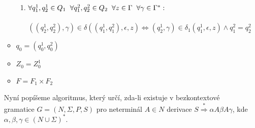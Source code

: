 \documentclass[a4paper,11pt]{article}[24.3.2010]
\begin{document}
\begin{enumerate}
\begin{itemize}
\begin{enumerate}
\item $\forall q_{1}^1,q_{2}^1 \in Q_{1} \hspace{2mm} \forall q_{1}^2,q_{2}^2 \in Q_{2} \hspace{2mm} \forall z \in \Gamma \hspace{2mm} \forall \gamma \in \Gamma^*:$\\\\
$((q_{2}^1,q_{2}^2),\gamma) \in \delta((q_{1}^1,q_{1}^2),\epsilon,z) \Leftrightarrow (q_{2}^1,\gamma) \in \delta_{1}(q_{1}^1,\epsilon,z) \wedge q_{1}^2 = q_{2}^2$\\
\end{enumerate}
\item $q_{0}=(q_{0}^1,q_{0}^2)$\\
\item $Z_{0}=Z_{0}^1$\\
\item $F=F_{1} \times F_{2}$
\end{itemize}

\newpage

Nyní popíšeme algoritmus, který určí, zda-li existuje v bezkontextové gramatice $G=(N,\Sigma,P,S)$ pro neterminál $A \in N$ derivace $S \overset{*}{\Rightarrow} \alpha A \beta A \gamma$, kde $\alpha,\beta,\gamma \in (N \cup \Sigma)^*$.\\


\end{enumerate}
\end{document}
